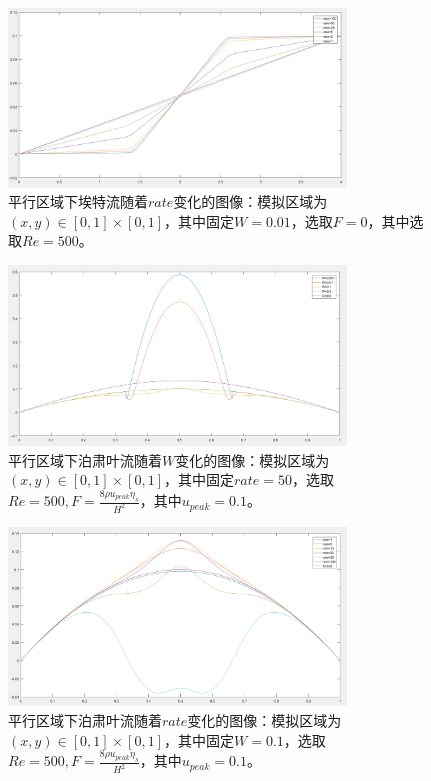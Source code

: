 \documentclass[11pt,UTF8]{ctexart}
\begin{document}
    \begin{figure}[h]
        \centerline{\includegraphics[width=0.8\textwidth]{cutte_rate.png}}
        \caption{平行区域下埃特流随着$rate$变化的图像：模拟区域为$(x,y)\in [0,1]\times [0,1]$，其中固定$W=0.01$，选取$F=0$，其中选取$Re=500$。}
        \label{img3}
    \end{figure}
    \begin{figure}[p]
        \centerline{\includegraphics[width=0.8\textwidth]{Poiseuille_W.png}}
        \caption{平行区域下泊肃叶流随着$W$变化的图像：模拟区域为$(x,y)\in [0,1]\times [0,1]$，其中固定$rate=50$，选取$Re=500,F=\frac{8\rho u_{peak} \eta_s}{H^2}$，其中$u_{peak}=0.1$。}
        \label{img4}
    \end{figure}
    \begin{figure}[h]
        \centerline{\includegraphics[width=0.8\textwidth]{Poiseuille_rate_W_0_1.png}}
        \caption{平行区域下泊肃叶流随着$rate$变化的图像：模拟区域为$(x,y)\in [0,1]\times [0,1]$，其中固定$W=0.1$，选取$Re=500,F=\frac{8\rho u_{peak} \eta_s}{H^2}$，其中$u_{peak}=0.1$。}
        \label{img5}
    \end{figure}
\end{document}
